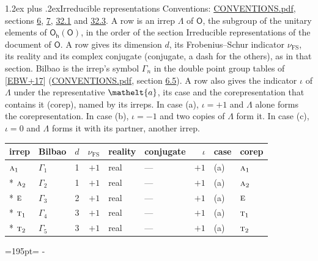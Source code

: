 \documentclass[10pt,a4paper]{article}
\makeatletter
\renewcommand\section{\@startsection{section}{1}{\z@}{-3ex plus -1ex minus -.2ex}%
  {1.2ex plus .2ex}{\normalfont\large\sffamily\bfseries\color{parttitle}}}
\newcommand{\needspace}[1]{\par\penalty-100\begingroup\dimen0=#1\relax\dimen2=\pagegoal
  \advance\dimen2-\pagetotal\ifdim\dimen0>\dimen2\relax\ifdim\dimen2>0pt\vfil\break\fi\fi
  \endgroup}
\numberwithin{equation}{section}
\newcommand{\eltfont}[1]{{\let\sigma\eltsigma\mathelt{#1}}}
\newcommand{\grp}[1]{\mathsf{#1}}
\newcommand{\irr}[1]{\text{\normalfont\scshape #1}}
\newcommand{\elt}[1]{\eltfont{#1}}
\newcommand{\fsind}{\nu_{\mathrm{FS}}}
\makeatother
\begin{document}
\section{Irreducible representations}\label{s:irreps}
Conventions: \href{../../CONVENTIONS.pdf}{CONVENTIONS.pdf}, sections \href{../../../rotation/CONVENTIONS.pdf\#conv.6}{6}, \href{../../../rotation/CONVENTIONS.pdf\#conv.7}{7}, \href{../../CONVENTIONS.pdf\#conv.32.1}{32.1} and \href{../../CONVENTIONS.pdf\#conv.32.3}{32.3}.
\leavevmode\label{n:irrep.Delta}A row is an irrep $\Lambda$ of $\grp{O}$, the subgroup of the unitary elements of $\grp{O_{h}}(\grp{O})$, in the order of the section Irreducible representations of the document of \href{../../../rotation/data/pdf/O.pdf}{$\grp{O}$}. \label{n:index.dimension}\label{n:index.frobenius}\label{n:head.irrep}\label{n:head.reality}\label{n:head.conjugate}A row gives its dimension $d$, its Frobenius--Schur indicator $\fsind$, its reality and its complex conjugate (conjugate, a dash for the others), as in that section. \label{n:head.bilbao}\label{n:irrep.alias.gamma}Bilbao is the irrep's symbol $\Gamma_n$ in the double point group tables of [\href{../../../REFERENCES.pdf\#ref.EBW+17}{EBW+17}] (\href{../../CONVENTIONS.pdf}{CONVENTIONS.pdf}, section \href{../../../rotation/CONVENTIONS.pdf\#conv.6.5}{6.5}). \label{n:head.case.corep}\label{n:head.corep}A row also gives the indicator $\iota$ of $\Lambda$ under the representative $\elt{a}$, its case and the corepresentation that contains it (corep), named by its irreps. In case (a), $\iota = +1$ and $\Lambda$ alone forms the corepresentation. In case (b), $\iota = -1$ and two copies of $\Lambda$ form it. In case (c), $\iota = 0$ and $\Lambda$ forms it with its partner, another irrep.
\setlength{\emergencystretch}{2em}\par\setlength{\emergencystretch}{0pt}
{\small\renewcommand{\arraystretch}{1.25}\setlength{\tabcolsep}{4pt}\begin{longtable}{@{}llrrllrll@{}}\toprule
irrep & Bilbao & $d$ & $\fsind$ & reality & conjugate & $\iota$ & case & corep\\\midrule\endhead
\bottomrule\endfoot\endlastfoot
$\irr{a}_{1}$ & $\Gamma_{1}$ & 1 & $+1$ & real & --- & $+1$ & (a) & $\irr{a}_{1}$\\*
$\irr{a}_{2}$ & $\Gamma_{2}$ & 1 & $+1$ & real & --- & $+1$ & (a) & $\irr{a}_{2}$\\*
$\irr{e}$ & $\Gamma_{3}$ & 2 & $+1$ & real & --- & $+1$ & (a) & $\irr{e}$\\*
$\irr{t}_{1}$ & $\Gamma_{4}$ & 3 & $+1$ & real & --- & $+1$ & (a) & $\irr{t}_{1}$\\*
$\irr{t}_{2}$ & $\Gamma_{5}$ & 3 & $+1$ & real & --- & $+1$ & (a) & $\irr{t}_{2}$\\
\bottomrule\end{longtable}}
\needspace{195pt}
\end{document}

